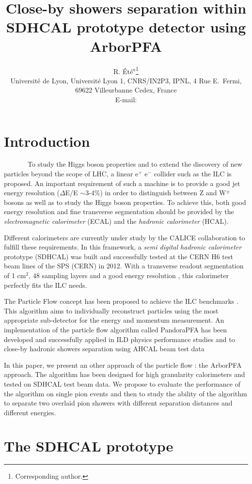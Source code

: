 \documentclass[cits]{JINST}
\title{Close-by showers separation within SDHCAL prototype detector using ArborPFA}
\author{R. \'Et\'e$^a$\thanks{Corresponding author.} \\%
\llap{$^a$} Universit\'e de Lyon, Universit\'e Lyon 1, CNRS/IN2P3, 
 IPNL, 4 Rue E.~Fermi, 69622 Villeurbanne Cedex, France\\
 
 
 E-mail: \email{rete@ipnl.in2p3.fr}
 }
\begin{document}

\newpage
\section{Introduction}

~~~~~~~To study the Higgs boson properties and to extend the discovery of new particles beyond the scope of LHC, a linear e$^+$ e$^-$ collider such as the ILC is proposed. An important requirement of such a machine is to provide a good jet energy resolution ($\Delta$E/E $\sim$3-4\%) in order to distinguish between Z and W$^{\pm}$ bosons as well as to study the Higgs boson properties. To achieve this, both good energy resolution and fine transverse segmentation should be provided by the \textit{electromagnetic calorimeter} (ECAL) and the \textit{hadronic calorimeter} (HCAL).

Different calorimeters are currently under study by the CALICE collaboration to fulfill these requirements. In this framework, a \textit{semi digital hadronic calorimeter} prototype (SDHCAL) was built \cite{sdhcal-paper} and successfully tested at the CERN H6 test beam lines of the SPS (CERN) in 2012. With a transverse readout segmentation of 1 cm$^2$, 48 sampling layers and a good energy resolution \cite{sdhcal-paper}, this calorimeter perfectly fits the ILC needs. 


The Particle Flow concept has been proposed to achieve the ILC benchmarks \cite{ilc-tdr}. This algorithm aims to individually reconstruct particles using the most appropriate sub-detector for the energy and momentum measurement. An implementation of the particle flow algorithm called PandoraPFA has been developed \cite{pandora-pfa} and successfully applied in ILD physics performance studies and to close-by hadronic showers separation using AHCAL beam test data %

In this paper, we present an other approach of the particle flow : the ArborPFA approach. The algorithm has been designed for high granularity calorimeters and tested on SDHCAL test beam data. We propose to evaluate the performance of the algorithm on single pion events and then to study the ability of the algorithm to separate two overlaid pion showers with different separation distances and different energies.

\newpage
\section{The SDHCAL prototype}
\end{document}
